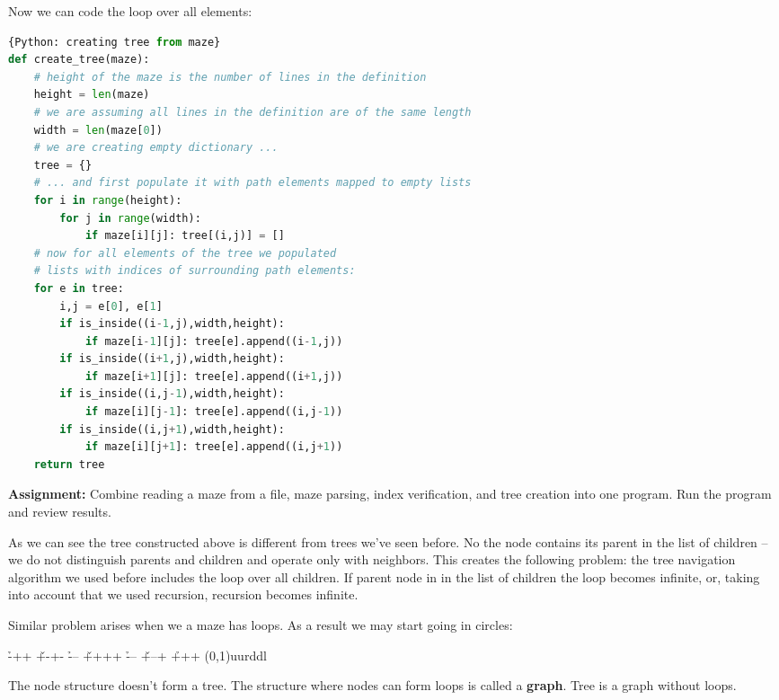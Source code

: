 Now we can code the loop over all elements:
\begin{lstlisting}[language=Python,style=codelst]{Python: creating tree from maze}
def create_tree(maze):
    # height of the maze is the number of lines in the definition
    height = len(maze)
    # we are assuming all lines in the definition are of the same length
    width = len(maze[0])
    # we are creating empty dictionary ...
    tree = {}
    # ... and first populate it with path elements mapped to empty lists
    for i in range(height):
        for j in range(width):
            if maze[i][j]: tree[(i,j)] = []
    # now for all elements of the tree we populated
    # lists with indices of surrounding path elements:
    for e in tree:
        i,j = e[0], e[1]
        if is_inside((i-1,j),width,height): 
            if maze[i-1][j]: tree[e].append((i-1,j))
        if is_inside((i+1,j),width,height): 
            if maze[i+1][j]: tree[e].append((i+1,j))
        if is_inside((i,j-1),width,height): 
            if maze[i][j-1]: tree[e].append((i,j-1))
        if is_inside((i,j+1),width,height): 
            if maze[i][j+1]: tree[e].append((i,j+1))
    return tree

\end{lstlisting}

\begin{tcolorbox}
\textbf{Assignment:}
Combine reading a maze from a file, maze parsing,
index verification, and tree creation into one program.
Run the program and review results.
\end{tcolorbox}

As we can see the tree constructed above is different from
trees we've seen before. No the node contains its parent
in the list of children -- we do not distinguish
parents and children and operate only with neighbors.
This creates the following problem: the tree navigation
algorithm we used before includes the loop over all
children. If parent node in in the list of children
the loop becomes infinite, or, taking into account
that we used recursion, recursion becomes infinite.

Similar problem arises when we a maze has loops.
As a result we may start going in circles:

\begin{labyrinth}{3}{4}
        \h -++
\v +-+- \h ---
\v ++++ \h ---
\v +--+ \h +++
\labyrinthsolution(0,1){uurddl}
\end{labyrinth}

The node structure doesn't form a tree. 
The structure where nodes can form loops is
called a \textbf{graph}. Tree is a graph without loops.


